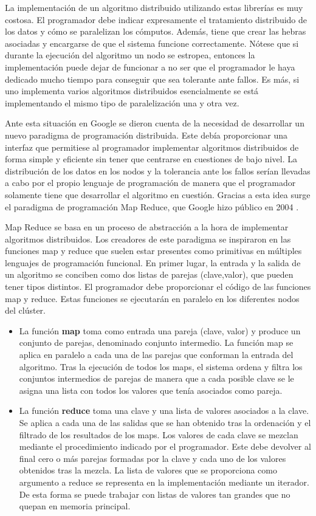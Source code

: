 \documentclass[10pt]{article}
\begin{document}
		La implementación de un algoritmo distribuido utilizando estas librerías es muy costosa. El programador debe indicar expresamente el tratamiento distribuido de los datos y cómo se paralelizan los cómputos. Además, tiene que crear las hebras asociadas y encargarse de que el sistema funcione correctamente. Nótese que si durante la ejecución del algoritmo un nodo se estropea, entonces la implementación puede dejar de funcionar a no ser que el programador le haya dedicado mucho tiempo para conseguir que sea tolerante ante fallos. Es más, si uno implementa varios algoritmos distribuidos esencialmente se está implementando el mismo tipo de paralelización una y otra vez.
	
		Ante esta situación en Google se dieron cuenta de la necesidad de desarrollar un nuevo paradigma de programación distribuida. Este debía proporcionar una interfaz que permitiese al programador implementar algoritmos distribuidos de forma simple y eficiente sin tener que centrarse en cuestiones de bajo nivel. La distribución de los datos en los nodos y la tolerancia ante los fallos serían llevadas a cabo por el propio lenguaje de programación de manera que el programador solamente tiene que desarrollar el algoritmo en cuestión. Gracias a esta idea surge el paradigma de programación Map Reduce, que Google hizo público en 2004 \cite{map-reduce1, map-reduce2, map-reduce3}.
	
		Map Reduce se basa en un proceso de abstracción a la hora de implementar algoritmos distribuidos. Los creadores de este paradigma se inspiraron en las funciones map y reduce que suelen estar presentes como primitivas en múltiples lenguajes de programación funcional. En primer lugar, la entrada y la salida de un algoritmo se conciben como dos listas de parejas (clave,valor), que pueden tener tipos distintos. El programador debe proporcionar el código de las funciones map y reduce. Estas funciones se ejecutarán en paralelo en los diferentes nodos del clúster.
		
		\begin{itemize}
			\item La función \textbf{map} toma como entrada una pareja (clave, valor) y produce un conjunto de parejas, denominado conjunto intermedio. La función map se aplica en paralelo a cada una de las parejas que conforman la entrada del algoritmo. Tras la ejecución de todos los maps, el sistema ordena y filtra los conjuntos intermedios de parejas de manera que a cada posible clave se le asigna una lista con todos los valores que tenía asociados como pareja.
			\item La función \textbf{reduce} toma una clave y una lista de valores asociados a la clave. Se aplica a cada una de las salidas que se han obtenido tras la ordenación y el filtrado de los resultados de los maps. Los valores de cada clave se mezclan mediante el procedimiento indicado por el programador. Este debe devolver al final cero o más parejas formadas por la clave y cada uno de los valores obtenidos tras la mezcla. La lista de valores que se proporciona como argumento a reduce se representa en la implementación mediante un iterador. De esta forma se puede trabajar con listas de valores tan grandes que no quepan en memoria principal.
		\end{itemize}  
		
\end{document}
